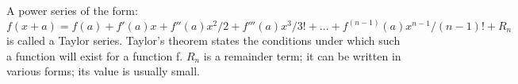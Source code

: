 A power series of the form:
$$
f(x+a)=f(a)+f'(a)x+f''(a)x^{2}/2+f'''(a)x^{3}/3!+... +f^{(n-1)}(a)x^{n-1}/(n-1)!+R_{n}
$$  
is called a Taylor series. Taylor's theorem states the 
conditions under which such a function will exist for a 
function f.
$R_{n}$  is a remainder term; it can be written in various forms;
its value is usually small.